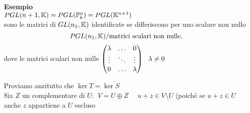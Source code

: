 \documentclass[12px]{article}
\begin{document}
 \textbf{Esempio}\\
 $PGL(n+1,\mathbb{K}) = PGL(\mathbb{P}^n_k) = PGL(\mathbb{K}^{n+1})$\\
 sono le matrici di $GL(n_1,\mathbb{K})$ identificate se differiscono per uno scalare non nullo
 \[
	 P GL(n_1,\mathbb{K})/\text{matrici scalari non nulle}
 .\] 
 dove le matrici scalari non nulle $\begin{pmatrix}\lambda & \ldots & 0\\\vdots & \ddots & \vdots\\ 0 & \ldots & \lambda\end{pmatrix} \ \ \lambda \neq 0$
 \begin{dimo}[Proposizione]
	Proviamo anzitutto che $\ker T = \ker S$ \\ Sia  $Z$ un complementare di $U: \ \ V=U\oplus Z$ \ \  $u+z\in V\setminus U$ (poiché se  $u+z\in U $ anche $z$ appartiene a $U$ escluso
\end{dimo}
\end{document}
